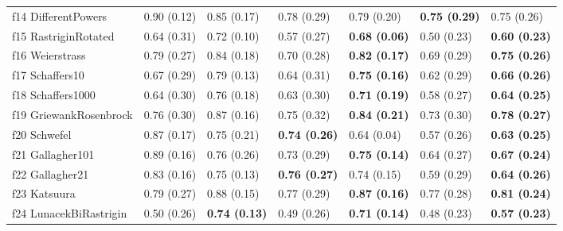 \begin{table}
\begin{tabular}{lllllll}
f14 DifferentPowers & 0.90 (0.12) & 0.85 (0.17) & 0.78 (0.29) & 0.79 (0.20) & \textbf{0.75 (0.29)} & 0.75 (0.26) \\
f15 RastriginRotated & 0.64 (0.31) & 0.72 (0.10) & 0.57 (0.27) & \textbf{0.68 (0.06)} & 0.50 (0.23) & \textbf{0.60 (0.23)} \\
f16 Weierstrass & 0.79 (0.27) & 0.84 (0.18) & 0.70 (0.28) & \textbf{0.82 (0.17)} & 0.69 (0.29) & \textbf{0.75 (0.26)} \\
f17 Schaffers10 & 0.67 (0.29) & 0.79 (0.13) & 0.64 (0.31) & \textbf{0.75 (0.16)} & 0.62 (0.29) & \textbf{0.66 (0.26)} \\
f18 Schaffers1000 & 0.64 (0.30) & 0.76 (0.18) & 0.63 (0.30) & \textbf{0.71 (0.19)} & 0.58 (0.27) & \textbf{0.64 (0.25)} \\
f19 GriewankRosenbrock & 0.76 (0.30) & 0.87 (0.16) & 0.75 (0.32) & \textbf{0.84 (0.21)} & 0.73 (0.30) & \textbf{0.78 (0.27)} \\
f20 Schwefel & 0.87 (0.17) & 0.75 (0.21) & \textbf{0.74 (0.26)} & 0.64 (0.04) & 0.57 (0.26) & \textbf{0.63 (0.25)} \\
f21 Gallagher101 & 0.89 (0.16) & 0.76 (0.26) & 0.73 (0.29) & \textbf{0.75 (0.14)} & 0.64 (0.27) & \textbf{0.67 (0.24)} \\
f22 Gallagher21 & 0.83 (0.16) & 0.75 (0.13) & \textbf{0.76 (0.27)} & 0.74 (0.15) & 0.59 (0.29) & \textbf{0.64 (0.26)} \\
f23 Katsuura & 0.79 (0.27) & 0.88 (0.15) & 0.77 (0.29) & \textbf{0.87 (0.16)} & 0.77 (0.28) & \textbf{0.81 (0.24)} \\
f24 LunacekBiRastrigin & 0.50 (0.26) & \textbf{0.74 (0.13)} & 0.49 (0.26) & \textbf{0.71 (0.14)} & 0.48 (0.23) & \textbf{0.57 (0.23)} \\
\bottomrule
\end{tabular}
\end{table}
